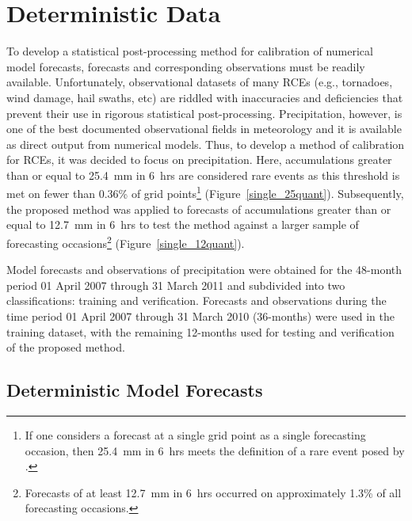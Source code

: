 

\section{Deterministic Data}
\label{ddata}

To develop a statistical post-processing method for calibration of numerical model forecasts, forecasts and corresponding observations must be readily available.
Unfortunately, observational datasets of many RCEs (e.g., tornadoes, wind damage, hail swaths, etc) are riddled with inaccuracies and deficiencies \citep{Doswell1988, Weiss2002, Trapp2006, Ortega2009} that prevent their use in rigorous statistical post-processing.
Precipitation, however, is one of the best documented observational fields in meteorology and it is available as direct output from numerical models.
Thus, to develop a method of calibration for RCEs, it was decided to focus on precipitation.
Here, accumulations greater than or equal to \mbox{25.4 mm} in \mbox{6 hrs} are considered rare events as this threshold is met on fewer than 0.36\% of grid points\footnote{If one considers a forecast at a single grid point as a single forecasting occasion, then \mbox{25.4 mm} in \mbox{6 hrs} meets the definition of a rare event posed by \cite{Murphy1991}.} (\mbox{Figure \ref{single_25quant}}).
Subsequently, the proposed method was applied to forecasts of accumulations greater than or equal to \mbox{12.7 mm} in \mbox{6 hrs} to test the method against a larger sample of forecasting occasions\footnote{Forecasts of at least \mbox{12.7 mm} in \mbox{6 hrs} occurred on approximately 1.3\% of all forecasting occasions.} (\mbox{Figure \ref{single_12quant}}).

Model forecasts and observations of precipitation were obtained for the 48-month period 01 April 2007 through 31 March 2011 and subdivided into two classifications: training and verification.
Forecasts and observations during the time period 01 April 2007 through 31 March 2010 (36-months) were used in the training dataset, with the remaining 12-months used for testing and verification of the proposed method.




\subsection{Deterministic Model Forecasts}
\label{dmodel}

